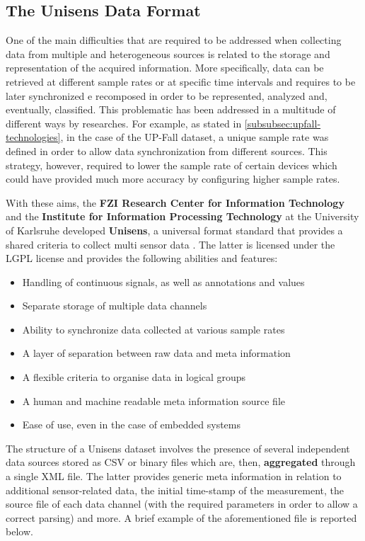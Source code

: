 \subsection{The Unisens Data Format}\label{subsec:unisens}

One of the main difficulties that are required to be addressed when collecting data from multiple and heterogeneous sources is related to the storage and representation of the acquired information. More specifically, data can be retrieved at different sample rates or at specific time intervals and requires to be later synchronized e recomposed in order to be represented, analyzed and, eventually, classified. This problematic has been addressed in a multitude of different ways by researches. For example, as stated in \ref{subsubsec:upfall-technologies}, in the case of the UP-Fall dataset, a unique sample rate was defined in order to allow data synchronization from different sources. This strategy, however, required to lower the sample rate of certain devices which could have provided much more accuracy by configuring higher sample rates.

With these aims, the \textbf{FZI Research Center for Information Technology} and the \textbf{Institute for Information Processing Technology} at the University of Karlsruhe developed \textbf{Unisens}, a universal format standard that provides a shared criteria to collect multi sensor data \cite{unisens}. The latter is licensed under the LGPL license and provides the following abilities and features: 

\begin{itemize}
    \item Handling of continuous signals, as well as annotations and values
    \item Separate storage of multiple data channels
    \item Ability to synchronize data collected at various sample rates
    \item A layer of separation between raw data and meta information
    \item A flexible criteria to organise data in logical groups
    \item A human and machine readable meta information source file
    \item Ease of use, even in the case of embedded systems
\end{itemize}

The structure of a Unisens dataset involves the presence of several independent data sources stored as CSV or binary files which are, then, \textbf{aggregated} through a single XML file. The latter provides generic meta information in relation to additional sensor-related data, the initial time-stamp of the measurement, the source file of each data channel (with the required parameters in order to allow a correct parsing) and more. A brief example of the aforementioned file is reported below.

